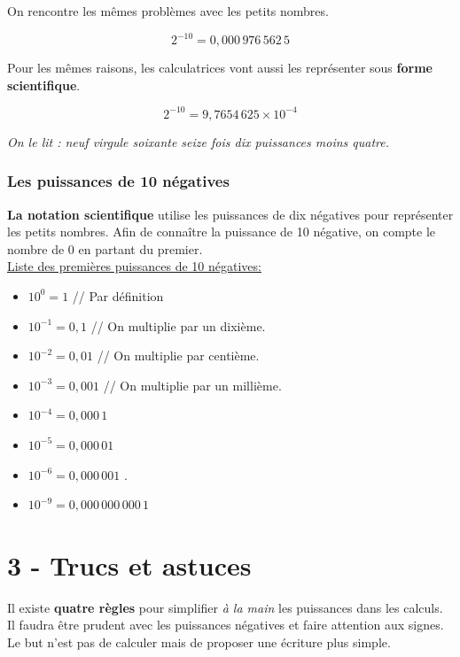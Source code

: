 \documentclass[12pt]{article}
\begin{document}
\begin{multicols}{2}

  On rencontre les mêmes problèmes avec les petits nombres.

  $$2^{-10} = 0, 000 \, 976\, 562\, 5$$

  Pour les mêmes raisons, les calculatrices vont aussi les représenter sous \textbf{forme scientifique}.

  $$2^{-10} = 9, 7654 \, 625 \times 10^{-4}$$

  \textit{On le lit : neuf virgule soixante seize fois dix puissances moins quatre.}

  \subsubsection*{Les puissances de 10 négatives}

  \textbf{La notation scientifique} utilise les puissances de dix négatives pour représenter les petits nombres. Afin de connaître la puissance de 10 négative, on compte le nombre de 0 en partant du premier. \\

  \underline{Liste des premières puissances de 10 négatives:} \\

  \begin{itemize}
  \item $10^0 = 1 $ // Par définition 
  \item $10^{-1} = 0,1$ // On multiplie par un dixième.
  \item $10^{-2} = 0,01$ // On multiplie par centième.
  \item $10^{-3} = 0,001$ // On multiplie par un millième.
  \item $10^{-4} = 0,000 \, 1$ 
  \item $10^{-5} = 0,000 \, 01$ 
  \item $10^{-6} = 0,000 \, 001$ .
  \item $10^{-9} = 0,000 \, 000 \, 000 \, 1$ 
  \end{itemize}
\end{multicols}

\newpage

\section*{3 - Trucs et astuces}

Il existe \textbf{quatre règles} pour simplifier \textit{à la main} les puissances dans les calculs. Il faudra être prudent avec les puissances négatives et faire attention aux signes. Le but n'est pas de calculer mais de proposer une écriture plus simple.
\end{document}
